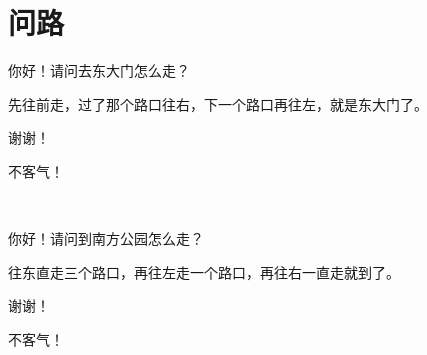 \documentclass[12pt,UTF-8,openany]{ctexbook}
\begin{document}
\clearpage

\begin{center}
    
\end{center}


\hanzibox{}\hanzibox{}\hanzibox{}\hanzibox{}\hspace{1em}\hanzibox{}\hanzibox{}\hanzibox{}\hanzibox{}

\hanzibox{}\hanzibox{}\hanzibox{}\hanzibox{}\hspace{1em}\hanzibox{}\hanzibox{}\hanzibox{}\hanzibox{}

\hanzibox{}\hanzibox{}\hanzibox{}\hanzibox{}\hspace{1em}\hanzibox{}\hanzibox{}\hanzibox{}\hanzibox{}

\hanzibox{}\hanzibox{}\hanzibox{}\hanzibox{}\hspace{1em}




\chapter{问路}

\begin{large}
    
    \begin{description}[itemsep=1ex,leftmargin=2.5em,labelwidth=2em]
    
    \item[{\color{script-1-1} 路人}]你好！请问去东大门怎么走？
    
    \item[{\color{script-1-0} 我}]先往前走，过了那个路口往右，下一个路口再往左，就是东大门了。
    
    \item[{\color{script-1-1} 路人}]谢谢！
    
    \item[{\color{script-1-0} 我}]不客气！
    
    \noindent ~
    
    \item[{\color{script-1-1} 路人}]你好！请问到南方公园怎么走？
    
    \item[{\color{script-1-0} 我}]往东直走三个路口，再往左走一个路口，再往右一直走就到了。
    
    \item[{\color{script-1-1} 路人}]谢谢！
    
    \item[{\color{script-1-0} 我}]不客气！
    
    \end{description}
    
    
\end{large}
\end{document}
